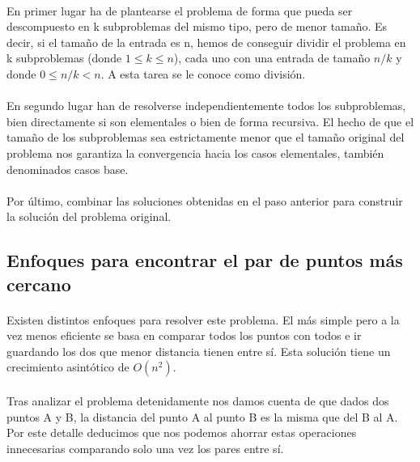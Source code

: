 \documentclass{article}
\begin{document}
		\paragraph{}
		En primer lugar ha de plantearse el problema de forma que pueda ser descompuesto en k subproblemas del mismo tipo, pero de menor tamaño. Es decir, si el tamaño de la entrada es n, hemos de conseguir dividir el problema en k subproblemas (donde $1 \leq k \leq n$), cada uno con una entrada de tamaño $n/k$ y donde $0 \leq n/k < n$. A esta tarea se le conoce como división.
		
		\paragraph{}
		En segundo lugar han de resolverse independientemente todos los subproblemas, bien directamente si son elementales o bien de forma recursiva. El hecho de que el tamaño de los subproblemas sea estrictamente menor que el tamaño original del problema nos garantiza la convergencia hacia los casos elementales, también denominados casos base.
		
		\paragraph{}
		Por último, combinar las soluciones obtenidas en el paso anterior para construir la solución del problema original.
		
	\subsection{Enfoques para encontrar el par de puntos más cercano}


		\paragraph{}
		Existen distintos enfoques para resolver este problema. El más simple pero a la vez menos eficiente se basa en comparar todos los puntos con todos e ir guardando los dos que menor distancia tienen entre sí. Esta solución tiene un crecimiento asintótico de $O(n^2)$.

		\paragraph{}
		Tras analizar el problema detenidamente nos damos cuenta de que dados dos puntos A y B, la distancia del punto A al punto B es la misma que del B al A. Por este detalle deducimos que nos podemos ahorrar estas operaciones innecesarias comparando solo una vez los pares entre sí.
	
\end{document}
